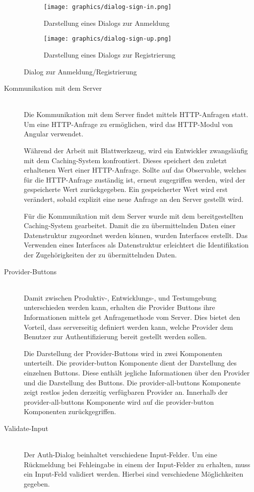 \begin{figure}[h]
	\centering
	\begin{subfigure}{.5\textwidth}
		\texttt{[image: graphics/dialog-sign-in.png]}
		\caption{Darstellung eines Dialogs zur Anmeldung}
		\label{fig:dialog_sign_in}
	\end{subfigure}%
	\begin{subfigure}{.5\textwidth}
		\texttt{[image: graphics/dialog-sign-up.png]}
		\caption{Darstellung eines Dialogs zur Registrierung}
		\label{fig:dialog_sign_up}
	\end{subfigure}
	\caption{Dialog zur Anmeldung/Registrierung}
	\label{fig:auth-dialog}
\end{figure}

\begin{description}
	\item[Kommunikation mit dem Server]\hfill\\
	Die Kommunikation mit dem Server findet mittels \gls{HTTP}-Anfragen statt. Um eine \gls{HTTP}-Anfrage zu ermöglichen, wird das \gls{HTTP}-Modul von Angular verwendet.

	Während der Arbeit mit Blattwerkzeug, wird ein Entwickler zwangsläufig mit dem Caching-System konfrontiert. Dieses speichert den zuletzt erhaltenen Wert einer \gls{HTTP}-Anfrage. Sollte auf das Observable, welches für die \gls{HTTP}-Anfrage zuständig ist, erneut zugegriffen werden, wird der gespeicherte Wert zurückgegeben. Ein gespeicherter Wert wird erst verändert, sobald explizit eine neue Anfrage an den Server gestellt wird.

	Für die Kommunikation mit dem Server wurde mit dem bereitgestellten Caching-System gearbeitet. Damit die zu übermittelnden Daten einer Datenstruktur zugeordnet werden können, wurden Interfaces erstellt. Das Verwenden eines Interfaces als Datenstruktur erleichtert die Identifikation der Zugehörigkeiten der zu übermittelnden Daten.

	\item[Provider-Buttons]\hfill\\
	Damit zwischen Produktiv-, Entwicklungs-, und Testumgebung unterschieden werden kann, erhalten die Provider Buttons ihre Informationen mittels get Anfragemethode vom Server. Dies bietet den Vorteil, dass serverseitig definiert werden kann, welche Provider dem Benutzer zur Authentifizierung bereit gestellt werden sollen.

	Die Darstellung der Provider-Buttons wird in zwei Komponenten unterteilt. Die provider-button Komponente dient der Darstellung des einzelnen Buttons. Diese enthält jegliche Informationen über den Provider und die Darstellung des Buttons. Die provider-all-buttons Komponente zeigt restlos jeden derzeitig verfügbaren Provider an. Innerhalb der provider-all-buttons Komponente wird auf die provider-button Komponenten zurückgegriffen.
	\item[Validate-Input]\hfill\\
	Der Auth-Dialog beinhaltet verschiedene Input-Felder. Um eine Rückmeldung bei Fehleingabe in einem der Input-Felder zu erhalten, muss ein Input-Feld validiert werden. Hierbei sind verschiedene Möglichkeiten gegeben.


\end{description}
